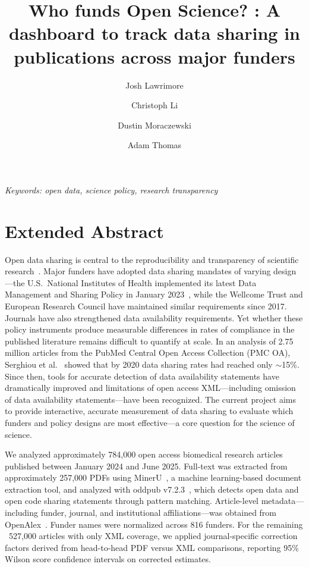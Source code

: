 \documentclass[a4paper,12pt]{article}
\title{\vspace{-2.5em}Who funds Open Science? : A dashboard to track data sharing in publications across major funders}
\author[1]{Josh Lawrimore}
\author[2]{Christoph Li}
\author[2]{Dustin Moraczewski}
\author[2]{Adam Thomas}
\affil[1]{Clinical Monitoring Research Program Directorate, Frederick National Laboratory for Cancer Research}
\affil[2]{Data Science \& Sharing Team, National Institute of Mental Health}
\date{}
\begin{document}
\vspace{-2em}
\maketitle
\thispagestyle{fancy}

\vspace{-2em}
\noindent\textit{Keywords: open data, science policy, research transparency}

\section*{Extended Abstract}

Open data sharing is central to the reproducibility and transparency of scientific research~\cite{Wilkinson2016, Baker2016}. Major funders have adopted data sharing mandates of varying design---the U.S.\ National Institutes of Health implemented its latest Data Management and Sharing Policy in January 2023~\cite{NIH2023dms}, while the Wellcome Trust and European Research Council have maintained similar requirements since 2017. Journals have also strengthened data availability requirements. Yet whether these policy instruments produce measurable differences in rates of compliance in the published literature remains difficult to quantify at scale. In an analysis of 2.75 million articles from the PubMed Central Open Access Collection (PMC OA), Serghiou et al.~\cite{Serghiou2021-pl} showed that by 2020 data sharing rates had reached only ${\sim}$15\%. Since then, tools for accurate detection of data availability statements have dramatically improved and limitations of open access XML---including omission of data availability statements---have been recognized. The current project aims to provide interactive, accurate measurement of data sharing to evaluate which funders and policy designs are most effective---a core question for the science of science.

We analyzed approximately 784,000 open access biomedical research articles published between January 2024 and June 2025. Full-text was extracted from approximately 257,000 PDFs using MinerU~\cite{Wang2024mineru}, a machine learning-based document extraction tool, and analyzed with oddpub v7.2.3~\cite{Riedel2020}, which detects open data and open code sharing statements through pattern matching. Article-level metadata---including funder, journal, and institutional affiliations---was obtained from OpenAlex~\cite{Priem2022}. Funder names were normalized across 816 funders. For the remaining ~527,000 articles with only XML coverage, we applied journal-specific correction factors derived from head-to-head PDF versus XML comparisons, reporting 95\% Wilson score confidence intervals on corrected estimates.
\end{document}
